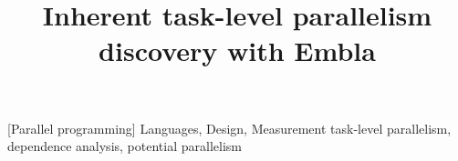 \documentclass[natbib]{sigplanconf}
\begin{document}
\title{Inherent task-level parallelism discovery with Embla}

          
\maketitle 



[Parallel programming]
\terms
Languages, Design, Measurement
\keywords
task-level parallelism, dependence analysis, potential parallelism









{}
\end{document}
